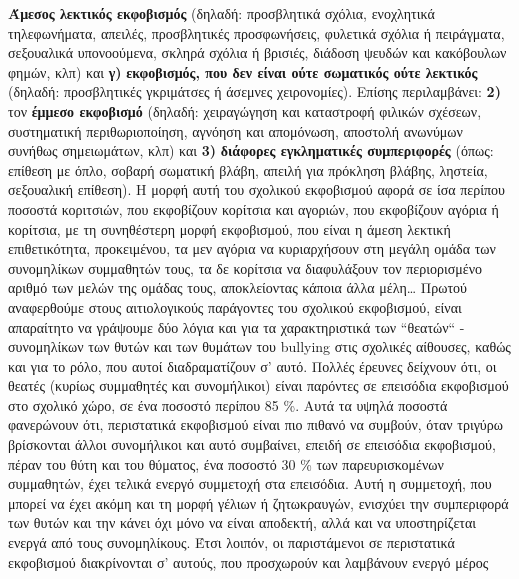\documentclass[12pt,a4paper]{book}
\begin{document}
\textbf{Άμεσος λεκτικός εκφοβισμός} (δηλαδή: προσβλητικά σχόλια, ενοχλητικά
τηλεφωνήματα, απειλές, προσβλητικές προσφωνήσεις, φυλετικά σχόλια ή πειράγματα, σεξουαλικά
υπονοούμενα, σκληρά σχόλια ή βρισιές, διάδοση ψευδών και κακόβουλων φημών,
κλπ) και \textbf{γ)} \textbf{εκφοβισμός, που δεν είναι ούτε σωματικός ούτε
λεκτικός} (δηλαδή: προσβλητικές γκριμάτσες ή άσεμνες χειρονομίες). Επίσης
περιλαμβάνει: \textbf{2)} τον \textbf{έμμεσο εκφοβισμό} (δηλαδή: χειραγώγηση και
καταστροφή φιλικών σχέσεων, συστηματική περιθωριοποίηση, αγνόηση και απομόνωση, αποστολή ανωνύμων
συνήθως σημειωμάτων, κλπ) και \textbf{3)} \textbf{διάφορες εγκληματικές
συμπεριφορές} (όπως: επίθεση με όπλο, σοβαρή σωματική βλάβη, απειλή για πρόκληση βλάβης,
ληστεία, σεξουαλική επίθεση).
\newline\setlength{\parindent}{40pt}\indent Η μορφή αυτή του σχολικού εκφοβισμού
αφορά σε ίσα περίπου ποσοστά κοριτσιών, που εκφοβίζουν κορίτσια και αγοριών, που
εκφοβίζουν αγόρια ή κορίτσια, με τη συνηθέστερη μορφή εκφοβισμού, που είναι η
άμεση λεκτική επιθετικότητα, προκειμένου, τα μεν αγόρια να κυριαρχήσουν στη
μεγάλη ομάδα των συνομηλίκων συμμαθητών τους, τα δε κορίτσια να διαφυλάξουν
τον περιορισμένο αριθμό των μελών της ομάδας τους,  αποκλείοντας κάποια άλλα
μέλη\ldots
\newline\setlength{\parindent}{40pt}\indent Πρωτού αναφερθούμε στους
αιτιολογικούς παράγοντες του σχολικού εκφοβισμού, είναι απαραίτητο να γράψουμε
δύο λόγια και για τα χαρακτηριστικά των ``θεατών`` - συνομηλίκων των θυτών και
των θυμάτων του bullying στις σχολικές αίθουσες, καθώς και για το ρόλο, που
αυτοί διαδραματίζουν σ' αυτό.
\newline\setlength{\parindent}{40pt}\indent Πολλές έρευνες δείχνουν ότι, οι
θεατές (κυρίως συμμαθητές και συνομήλικοι) είναι παρόντες σε επεισόδια εκφοβισμού στο σχολικό χώρο, σε ένα ποσοστό περίπου \num{85} \%. Αυτά τα υψηλά ποσοστά φανερώνουν ότι, περιστατικά εκφοβισμού είναι πιο πιθανό να συμβούν, όταν τριγύρω βρίσκονται
άλλοι συνομήλικοι  και αυτό συμβαίνει, επειδή σε επεισόδια εκφοβισμού, πέραν του
θύτη και του θύματος, ένα ποσοστό \num{30} \% των παρευρισκομένων συμμαθητών,
έχει τελικά ενεργό συμμετοχή στα επεισόδια.
\newline\setlength{\parindent}{40pt}\indent Αυτή η συμμετοχή, που μπορεί να έχει ακόμη και τη μορφή γέλιων ή ζητωκραυγών, ενισχύει την συμπεριφορά των θυτών και την κάνει όχι μόνο να είναι αποδεκτή, αλλά και να υποστηρίζεται ενεργά από τους συνομηλίκους. Έτσι λοιπόν, οι παριστάμενοι σε περιστατικά
εκφοβισμού διακρίνονται σ' αυτούς, που προσχωρούν και λαμβάνουν ενεργό μέρος
\end{document}
